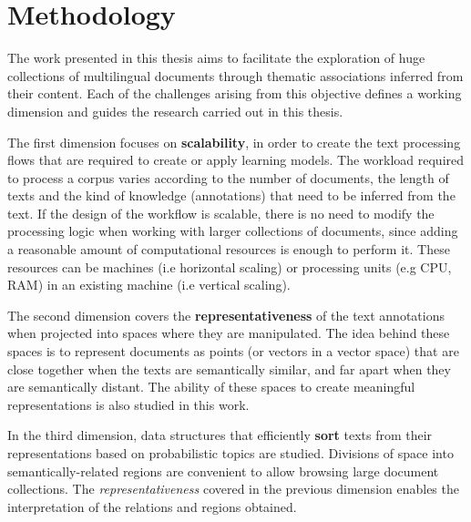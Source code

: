 

\chapter{Methodology}\label{ch:hypothesis}

\graphicspath{{hypothesis/figures/}}


The work presented in this thesis aims to facilitate the exploration of huge collections of multilingual documents through thematic associations inferred from their content. Each of the challenges arising from this objective defines a working dimension and guides the research carried out in this thesis.

The first dimension focuses on \textbf{scalability}, in order to create the text processing flows that are required to create or apply learning models. The workload required to process a corpus varies according to the number of documents, the length of texts and the kind of knowledge (annotations) that need to be inferred from the text. If the design of the workflow is scalable, there is no need to modify the processing logic when working with larger collections of documents, since adding a reasonable amount of computational resources is enough to perform it. These resources can be machines (i.e horizontal scaling) or processing units (e.g CPU, RAM) in an existing machine (i.e vertical scaling). 

The second dimension covers the \textbf{representativeness} of the text annotations when projected into spaces where they are manipulated. The idea behind these spaces is to represent documents as points (or vectors in a vector space) that are close together when the texts are semantically similar, and far apart when they are semantically distant. The ability of these spaces to create meaningful representations is also studied in this work.

In the third dimension, data structures that efficiently \textbf{sort} texts from their representations based on probabilistic topics are studied. Divisions of space into semantically-related regions are convenient to allow browsing large document collections. The \textit{representativeness} covered in the previous dimension enables the interpretation of the relations and regions obtained.

